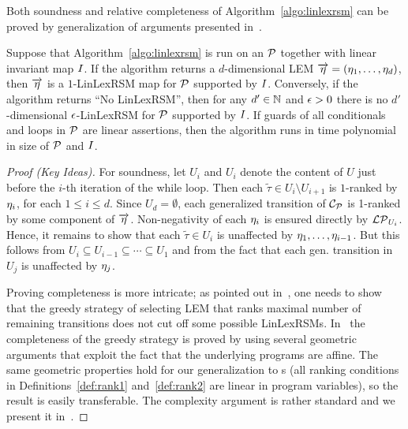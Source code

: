 Both soundness and relative completeness of Algorithm~\ref{algo:linlexrsm} 
can be proved by generalization of arguments presented 
in~\cite{ADFG10:lexicographic}. 
\begin{theorem}
\label{thm:algo}
\label{THM:ALGO}
	Suppose that Algorithm~\ref{algo:linlexrsm} is run on an \APP{} $\mathcal{P}$ 
	together with linear invariant map $I$. If the algorithm returns a 
	$d$-dimensional LEM $\overrightarrow{\eta}=(\eta_1,\dots,\eta_d)$, then 
	$\overrightarrow{\eta}$ 
	is a $1$-LinLexRSM map for $\mathcal{P}$ supported by $I$. Conversely, if 
	the algorithm returns ``No LinLexRSM'', then for any $d'\in \mathbb{N}$ and 
	$\epsilon>0$ there is no $d'$-dimensional $\epsilon$-LinLexRSM for $\mathcal{P}$  
	supported by $I$. If guards of all conditionals and loops in $\mathcal{P}$
	are linear assertions, then the
	algorithm runs in time polynomial in size of 
	$\mathcal{P}$ and $I$.
\end{theorem}
\begin{proof}[Proof (Key Ideas)]
For soundness, let $U_i$ and $U_{i}$ denote the content of $U$ just before the 
$i$-th iteration of the while loop. Then each $\tilde{\tau}\in U_{i}\setminus 
U_{i+1}$ is $1$-ranked by $\eta_i$, for each $1\leq i \leq d$. Since 
$U_{d}=\emptyset$, each generalized transition of $\mathcal{C}_{\mathcal{P}}$ is 
1-ranked by some component of $\overrightarrow{\eta}$. Non-negativity of each 
$\eta_i$ is ensured directly by $\mathcal{LP}_{U_i}$. Hence, it remains to show that 
each $\tilde{\tau}\in U_i$ is unaffected by $\eta_1,\dots,\eta_{i-1}$. But this 
follows from $U_i \subseteq U_{i-1}\subseteq \cdots\subseteq U_1$ and from the 
fact that each gen. transition in $U_j$ is unaffected by $\eta_j$.

Proving completeness is more intricate; as pointed out 
in~\cite{ADFG10:lexicographic}, one needs to show that the greedy strategy of 
selecting LEM that ranks maximal number of remaining transitions does not cut 
off some possible LinLexRSMs. In~\cite{ADFG10:lexicographic} the completeness 
of the greedy strategy is proved by using several geometric arguments that 
exploit the fact that the underlying programs are affine. The same geometric 
properties hold for our generalization to \APP{}s (all ranking conditions in 
Definitions~\ref{def:rank1} and~\ref{def:rank2} are linear in program 
variables), so the result is easily transferable. The complexity argument is 
rather standard and we present it in~\AppendixMaterial.
\end{proof}

